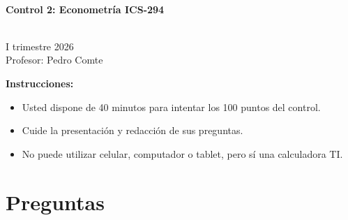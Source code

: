 \documentclass[10pt,a4paper]{article}
\begin{document}
\vspace{5cm}



\begin{center}
\begin{large}
\textbf{\\Control 2: Econometría ICS-294}
\end{large}\\
\vspace{0.2cm}
I trimestre 2026\\
Profesor: Pedro Comte\\
\end{center}

\textbf{Instrucciones:} 

\begin{itemize}

    \item Usted dispone de 40 minutos  para intentar los 100 puntos del control.
    \item Cuide la presentación y redacción de sus preguntas.
    \item No puede utilizar celular, computador o tablet, pero sí una calculadora TI.
     
\end{itemize}

\section{Preguntas}
\end{document}
